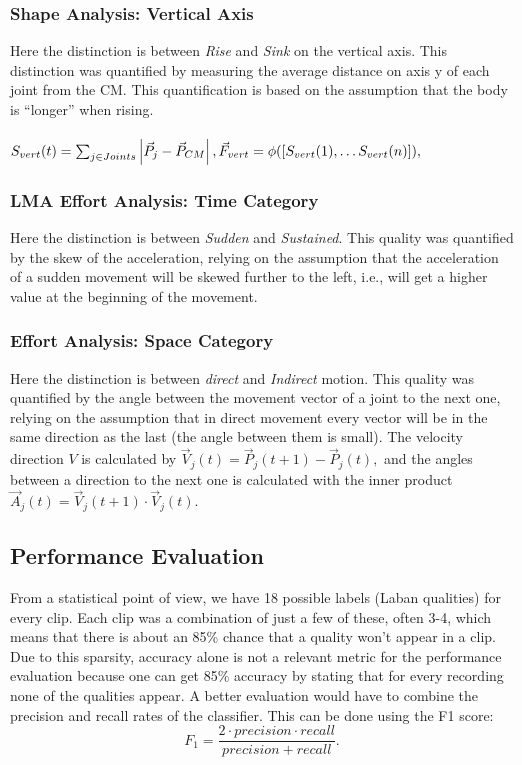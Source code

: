 \documentclass[journal]{journal}
\begin{document}
\subsubsection{Shape Analysis: Vertical Axis}
Here the distinction is between \textit{Rise} and \textit{Sink} on the vertical
axis.
This distinction was quantified by measuring the average distance on axis y of each joint from the CM. This quantification is based on the assumption that the body
is ``longer'' when rising.
\\\\$S_{vert}(t) = \sum_{j \in Joints}
\left|\vec{P}_{j}-\vec{P}_{CM}\right|,
\\\\\vec{F}_{vert} = \phi([S_{vert}(1), \ldots S_{vert}(n)]),$
\subsubsection{LMA Effort Analysis: Time Category}
Here the distinction is between \textit{Sudden} and \textit{Sustained}. This quality was quantified by the skew of the acceleration, relying on the assumption that the
acceleration of a sudden movement will be skewed further to the left, i.e., will get
a higher value at the beginning of the movement.
\subsubsection{Effort Analysis: Space Category}
Here the distinction is between \textit{direct} and \textit{Indirect} motion.
This quality was quantified by the angle between the movement vector of a joint to the next one,
relying on the assumption that in direct movement every vector will be in
the same direction as the last (the angle between them is small).
The velocity direction $V$ is calculated by
$\vec{V}_{j}(t) = \vec{P}_{j}(t+1) - \vec{P}_{j}(t),$
and the angles between a direction to the next one is calculated with the inner product
$\vec{A}_{j}(t) = \vec{V}_{j}(t+1) \cdot \vec{V}_{j}(t).$

\subsection{Performance Evaluation}
From a statistical point of view, we have 18 possible labels (Laban qualities) for every clip. 
Each clip was a combination of just a few of these, often 3-4, which means that there is about 
an 85\% chance that a quality won't appear in a clip. Due to this sparsity, accuracy alone is 
not a relevant metric for the performance evaluation because one can get 85\% accuracy by stating 
that for every recording none of the qualities appear. 
A better evaluation would have to combine the precision and recall rates of the classifier. 
This can be done using the F1 score:
\begin{equation*}
F_{1} = \frac{2\cdot precision\cdot recall}{precision+recall}.
\end{equation*} 
\end{document}

